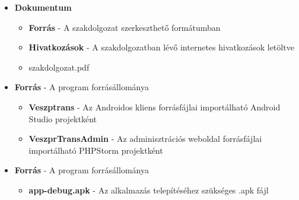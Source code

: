 \documentclass[a4paper,oneside,10pt]{report}
\begin{document}
\begin{itemize}
\item \textbf{Dokumentum}
	\begin{itemize}
		\item \textbf{Forrás} - A szakdolgozat szerkeszthető formátumban
		\item \textbf{Hivatkozások} - A szakdolgozatban lévő internetes hivatkozások letöltve
		\item szakdolgozat.pdf
	\end{itemize}
\item \textbf{Forrás} - A program forrásállománya
	\begin{itemize}
		\item \textbf{Veszptrans} - Az Androidos kliens forrásfájlai importálható Android Studio projektként
		\item \textbf{VeszprTransAdmin} - Az adminisztrációs weboldal forrásfájlai importálható PHPStorm projektként
	\end{itemize}
\item \textbf{Forrás} - A program forrásállománya
	\begin{itemize}
		\item \textbf{app-debug.apk} - Az alkalmazás telepítéséhez szükséges .apk fájl
	\end{itemize}
\end{itemize}


\appendix

\end{document}
